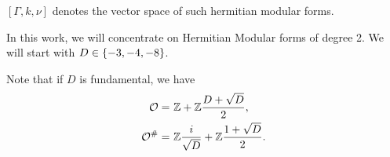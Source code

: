 $[\Gamma, k, \nu]$ denotes the vector space of such hermitian modular forms.

In this work, we will concentrate on Hermitian Modular forms of degree 2. We will start with $D \in \Set{-3,-4,-8}$.


Note that if $D$ is fundamental, we have
\begin{align*}
\mathcal{O} = &\ \mathbb{Z} +  \mathbb{Z} \frac{D+\sqrt{D}}{2} , \\
\mathcal{O}^\# = & \ \mathbb{Z} \frac{i}{\sqrt{D}} + \mathbb{Z} \frac{1 + \sqrt{D}}{2} .
\end{align*}
